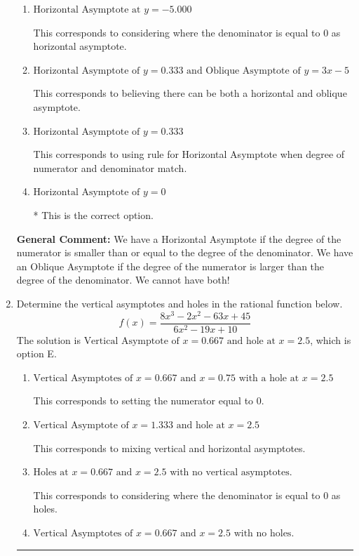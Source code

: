 \documentclass{extbook}[14pt]
\newcommand{\litem}[1]{\item #1

\rule{\textwidth}{0.4pt}}
\begin{document}
\begin{enumerate}
{\begin{enumerate}[label=\Alph*.]
This corresponds to flipping the numerator and denominator, then using synthetic division to find the oblique asymptote.
\item \( \text{Horizontal Asymptote at } y = -5.000 \)

This corresponds to considering where the denominator is equal to 0 as horizontal asymptote.
\item \( \text{Horizontal Asymptote of } y = 0.333 \text{ and Oblique Asymptote of } y = 3x -5 \)

This corresponds to believing there can be both a horizontal and oblique asymptote.
\item \( \text{Horizontal Asymptote of } y = 0.333  \)

This corresponds to using rule for Horizontal Asymptote when degree of numerator and denominator match.
\item \( \text{Horizontal Asymptote of } y = 0 \)

* This is the correct option.
\end{enumerate}

\textbf{General Comment:} We have a Horizontal Asymptote if the degree of the numerator is smaller than or equal to the degree of the denominator. We have an Oblique Asymptote if the degree of the numerator is larger than the degree of the denominator. We cannot have both!
}
\litem{
Determine the vertical asymptotes and holes in the rational function below.
\[ f(x) = \frac{8x^{3} -2 x^{2} -63 x + 45}{6x^{2} -19 x + 10} \]The solution is \( \text{Vertical Asymptote of } x = 0.667 \text{ and hole at } x = 2.5 \), which is option E.\begin{enumerate}[label=\Alph*.]
\item \( \text{Vertical Asymptotes of } x = 0.667 \text{ and } x = 0.75 \text{ with a hole at } x = 2.5 \)

This corresponds to setting the numerator equal to 0.
\item \( \text{Vertical Asymptote of } x = 1.333 \text{ and hole at } x = 2.5 \)

This corresponds to mixing vertical and horizontal asymptotes.
\item \( \text{Holes at } x = 0.667 \text{ and } x = 2.5 \text{ with no vertical asymptotes.} \)

This corresponds to considering where the denominator is equal to 0 as holes.
\item \( \text{Vertical Asymptotes of } x = 0.667 \text{ and } x = 2.5 \text{ with no holes.} \)


\end{enumerate}}
\end{enumerate}
\end{document}
